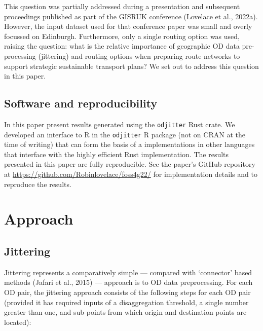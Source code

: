 \documentclass{isprs} %
\begin{document}
This question was partially addressed during a presentation and subsequent proceedings published as part of the GISRUK conference (Lovelace et al., 2022a).
However, the input dataset used for that conference paper was small and overly focussed on Edinburgh.
Furthermore, only a single routing option was used, raising the question:
what is the relative importance of geographic OD data pre-processing (jittering) and routing options when preparing route networks to support strategic sustainable transport plans?
We set out to address this question in this paper.

\hypertarget{software-and-reproducibility}{%
\subsection{Software and reproducibility}\label{software-and-reproducibility}}

In this paper present results generated using the \texttt{odjitter} Rust crate.
We developed an interface to R in the \texttt{odjitter} R package (not on CRAN at the time of writing) that can form the basis of a implementations in other languages that interface with the highly efficient Rust implementation.
The results presented in this paper are fully reproducible.
See the paper's GitHub repository at \url{https://github.com/Robinlovelace/foss4g22/} for implementation details and to reproduce the results.

\hypertarget{approach}{%
\section{Approach}\label{approach}}

\hypertarget{jittering}{%
\subsection{Jittering}\label{jittering}}

Jittering represents a comparatively simple --- compared with `connector' based methods (Jafari et al., 2015) --- approach is to OD data preprocessing.
For each OD pair, the jittering approach consists of the following steps for each OD pair (provided it has required inputs of a disaggregation threshold, a single number greater than one, and sub-points from which origin and destination points are located):
\end{document}
